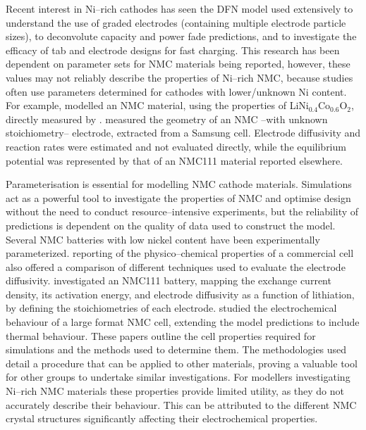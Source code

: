 \documentclass[journal=jacsat,manuscript=article]{achemso}
\begin{document}
Recent interest in Ni--rich cathodes has seen the DFN model used extensively to understand the use of graded electrodes (containing multiple electrode particle sizes), to deconvolute capacity and power fade predictions, and to investigate the efficacy of tab and electrode designs for fast charging.\cite{Richardson2020,Kindermann2017,Sturm2019} 
This research has been dependent on parameter sets for NMC materials being reported, however, these values may not reliably describe the properties of Ni--rich NMC, because studies often use parameters determined for cathodes with lower/unknown Ni content. 
For example, \citeauthor{Richardson2020} modelled an NMC material, using the properties of LiNi$_{0.4}$Co$_{0.6}$O$_2$, directly measured by \citeauthor{Ecker2015}.\cite{Richardson2020,Ecker2015}
\citeauthor{Kindermann2017} measured the geometry of an NMC --with unknown stoichiometry-- electrode, extracted from a Samsung cell.\cite{Kindermann2017} 
Electrode diffusivity and reaction rates were estimated and not evaluated directly, while the equilibrium potential was represented by that of an NMC111 material reported elsewhere.\cite{Stewart_2008} 

Parameterisation is essential for modelling NMC cathode materials. Simulations act as a powerful tool to investigate the properties of NMC and optimise design without the need to conduct resource--intensive experiments, but the reliability of predictions is dependent on the quality of data used to construct the model.\cite{shearing_2020_3D} 
Several NMC batteries with low nickel content have been experimentally parameterized.\cite{Ecker2015,Schmalstieg_Rahe_Ecker_Sauer_2018,Liebig_2019}
\citeauthor{Ecker2015} reporting of the physico--chemical properties of a commercial cell also offered a comparison of different techniques used to evaluate the electrode diffusivity.\cite{Ecker2015} \citeauthor{Schmalstieg_Rahe_Ecker_Sauer_2018} investigated an NMC111 battery, mapping the exchange current density, its activation energy, and electrode diffusivity as a function of lithiation, by defining the stoichiometries of each electrode.\cite{Schmalstieg_Rahe_Ecker_Sauer_2018} 
\citeauthor{Liebig_2019} studied the electrochemical behaviour of a large format NMC cell, extending the model predictions to include thermal behaviour.\cite{Liebig_2019} 
These papers outline the cell properties required for simulations and the methods used to determine them.
The methodologies used detail a procedure that can be applied to other materials, proving a valuable tool for other groups to undertake similar investigations. 
For modellers investigating Ni--rich NMC materials these properties provide limited utility, as they do not accurately describe their behaviour. 
This can be attributed to the different NMC crystal structures significantly affecting their electrochemical properties.\cite{noh2013comparison} 
\end{document}
